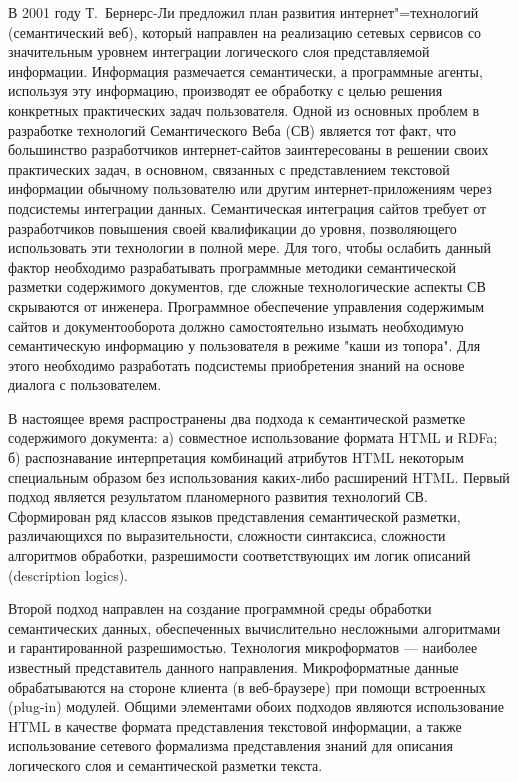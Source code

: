 \documentclass[utf8]{../IncArticle}
\begin{document}
\introduction{}

В 2001 году Т.~Бернерс-Ли предложил план развития интернет"=технологий
(семантический веб), который направлен на реализацию сетевых сервисов
со значительным уровнем интеграции логического слоя представляемой
информации.  Информация размечается семантически, а программные
агенты, используя эту информацию, производят ее обработку с целью
решения конкретных практических задач пользователя. Одной из основных
проблем в разработке технологий Семантического Веба (СВ) является тот факт,
что большинство разработчиков интернет-сайтов заинтересованы в решении
своих практических задач, в основном, связанных с представлением
текстовой информации обычному пользователю или другим
интернет-приложениям через подсистемы интеграции данных.
Семантическая интеграция сайтов требует от разработчиков повышения
своей квалификации до уровня, позволяющего использовать эти технологии
в полной мере.  Для того, чтобы ослабить данный фактор необходимо
разрабатывать программные методики семантической разметки содержимого
документов, где сложные технологические аспекты СВ
скрываются от инженера.  Программное обеспечение управления содержимым
сайтов и документооборота должно самостоятельно изымать необходимую
семантическую информацию у пользователя в режиме "каши из топора".
Для этого необходимо разработать подсистемы приобретения знаний на
основе диалога с пользователем.

В настоящее время распространены два подхода к семантической разметке содержимого
документа: а) совместное использование формата HTML и RDFa; б)
распознавание интерпретация комбинаций атрибутов HTML некоторым
специальным образом без использования каких-либо расширений HTML.  Первый подход является
результатом планомерного развития технологий СВ.  Сформирован ряд
классов языков представления семантической
разметки, различающихся по выразительности, сложности синтаксиса,
сложности алгоритмов обработки, разрешимости соответствующих им
логик описаний (description logics).

Второй подход направлен на создание программной среды обработки
семантических данных, обеспеченных вычислительно несложными
алгоритмами и гарантированной разрешимостью.  Технология микроформатов
\cite{b2:2} --- наиболее известный представитель данного направления.
Микроформатные данные обрабатываются на стороне клиента (в
веб-браузере) при помощи встроенных (plug-in) модулей.  Общими
элементами обоих подходов являются использование HTML в качестве
формата представления текстовой информации, а также использование сетевого
формализма представления знаний для описания логического
слоя и семантической разметки текста.
\end{document}
